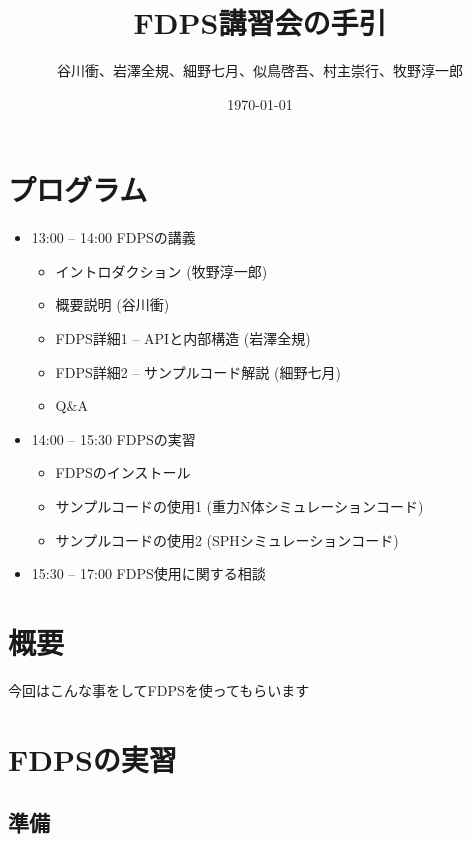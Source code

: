 \documentclass[12pt,a4paper,dvipdfmx]{jarticle}
\title{FDPS講習会の手引}
\author{谷川衝、岩澤全規、細野七月、似鳥啓吾、村主崇行、牧野淳一郎}
\date{\today}
\begin{document}
\maketitle
\tableofcontents

\newpage

\section{プログラム}

\begin{itemize}

\item 13:00 -- 14:00 FDPSの講義
  \begin{itemize}
  \item イントロダクション (牧野淳一郎)
  \item 概要説明 (谷川衝)
  \item FDPS詳細1 -- APIと内部構造 (岩澤全規)
  \item FDPS詳細2 -- サンプルコード解説 (細野七月)
  \item Q\&A
  \end{itemize}

\item 14:00 -- 15:30 FDPSの実習
  \begin{itemize}
  \item FDPSのインストール
  \item サンプルコードの使用1 (重力N体シミュレーションコード)
  \item サンプルコードの使用2 (SPHシミュレーションコード)
  \end{itemize}

\item 15:30 -- 17:00 FDPS使用に関する相談

\end{itemize}

\newpage

\section{概要}
今回はこんな事をしてFDPSを使ってもらいます


\section{FDPSの実習}

\subsection{準備}
\end{document}
